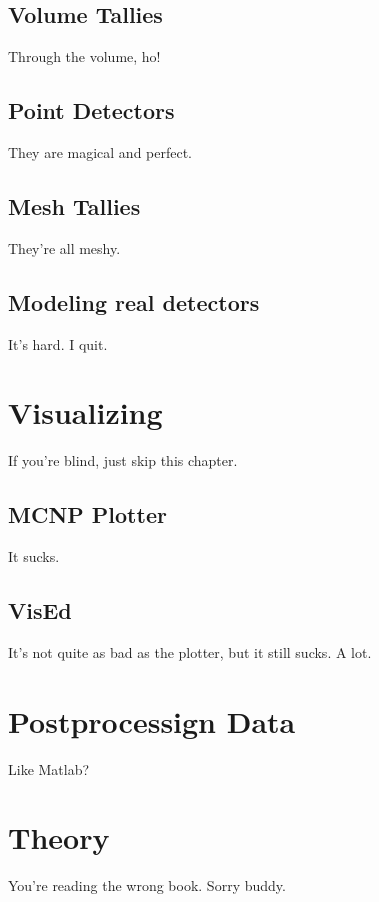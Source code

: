 \documentclass[10pt,a4paper]{book}
\begin{document}
\section{Volume Tallies}
Through the volume, ho!

\section{Point Detectors}
They are magical and perfect.

\section{Mesh Tallies}
They're all meshy.

\section{Modeling real detectors}
It's hard. I quit.

\chapter{Visualizing}
If you're blind, just skip this chapter.

\section{MCNP Plotter}
It sucks.

\section{VisEd}
It's not quite as bad as the plotter, but it still sucks. A lot.

\chapter{Postprocessign Data}
Like Matlab?

\chapter{Theory}
You're reading the wrong book. Sorry buddy.
\end{document}
